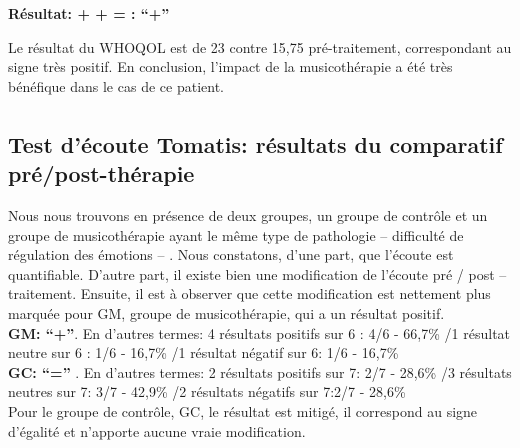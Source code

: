                 \textbf{ Résultat:  +  +  =     : ``+''}
                
                
    Le résultat du WHOQOL est de  23 contre 15,75 pré-traitement, correspondant
    au signe très positif. En conclusion, l'impact de la musicothérapie a été très bénéfique dans le cas de 
    ce patient.           

 


\subsection{Test d'écoute Tomatis\textsuperscript \textregistered : résultats du comparatif 
pré/post-thérapie}
 Nous nous trouvons
           en présence de deux groupes, un groupe de contrôle et un
           groupe de musicothérapie ayant le même type de
           pathologie -- difficulté de régulation des émotions -- .
Nous constatons, d'une part, que l'écoute est quantifiable.
           D'autre part, il existe bien
          une modification de l'écoute pré / post -- traitement.
Ensuite, il est à observer que
          cette modification est nettement plus marquée
          pour GM, groupe de musicothérapie, qui a un résultat positif.
          \\
 \textbf{GM: ``+''}.
          En d'autres termes: 4 résultats positifs sur 6 : 4/6 - 66,7\%
        /1 résultat neutre sur 6 : 1/6 - 16,7\%
        /1 résultat négatif sur 6: 1/6 - 16,7\%
        \\
          \textbf{GC:  ``='' }.
En d'autres termes:  2 résultats positifs sur 7: 2/7 - 28,6\%
   /3 résultats neutres sur 7: 3/7 - 42,9\%
   /2 résultats négatifs sur 7:2/7 - 28,6\%
\\
Pour le groupe de contrôle, GC, le résultat est mitigé, il correspond au signe d'égalité et n'apporte 
aucune vraie modification.




















